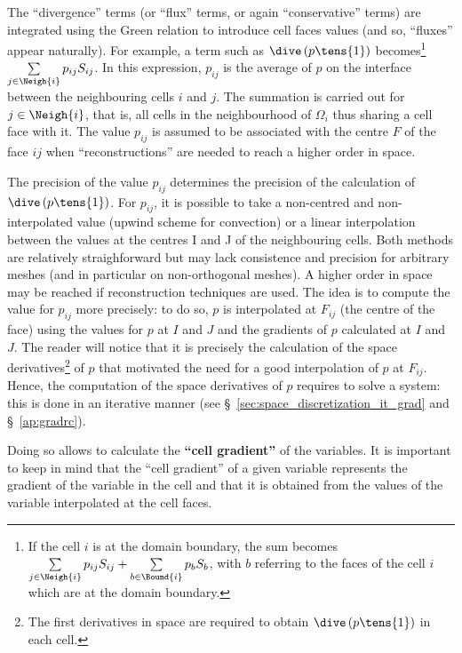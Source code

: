The ``divergence'' terms (or ``flux'' terms, or again ``conservative''
terms) are integrated using the Green relation to introduce cell faces
values (and so, ``fluxes'' appear naturally). For example, a term such as 
$\dive \left(p \tens{1}\right)$ becomes\footnote{%
If the cell $i$ is at the domain boundary, the sum becomes 
$\sum\limits_{j\in \Neigh{i}}p_{ij}S_{ij}+\sum\limits_{b \in \Bound{i}
}p_{b}S_{b}$, 
with $b$ referring to the faces
of the cell $i$ which are at the domain boundary.} 
$\sum\limits_{j \in \Neigh{i}} p_{ij}S_{ij}$.
In this expression, $p_{ij}$
is the average of $p$ on the interface between the neighbouring cells $i$
and $j$. The summation is carried out for $j\in \Neigh{i}$, that is, all
cells in the neighbourhood of $\Omega_{i}$ thus sharing a cell face with
it. The value $p_{ij}$ is
assumed to be associated with the centre $F$
 of the face $ij$ when
``reconstructions'' are needed to reach a higher order in space.

The precision of the value $p_{ij}$ determines the precision of the
calculation of $\dive \left(p \tens{1}\right)$. For $p_{ij}$, it is possible to take a non-centred
and non-interpolated value (upwind scheme for convection) or a linear
interpolation between the values at the centres I and J of the neighbouring
cells. Both methods are relatively straighforward but may lack consistence
and precision for arbitrary meshes (and in particular on non-orthogonal
meshes). A higher order in space may be reached if reconstruction techniques
are used. The idea is to compute the value for $p_{ij}$ more precisely: to
do so, $p$ is interpolated at $F_{ij}$ (the centre of the face) using the
values for $p$ at $I$ and $J$ and the gradients of $p$ calculated at $I$ and $J$.
The reader will notice that it is precisely the calculation of the space
derivatives\footnote{%
The first derivatives in space are required to obtain $\dive \left(p \tens{1}\right)$ in each cell.}
of $p$ that motivated the need for a good interpolation of $p$ at $F_{ij}$.
Hence, the computation of the space derivatives of $p$ requires to solve a
system: this is done in an iterative manner (see \S~\ref{sec:space_discretization_it_grad} and \S~\ref{ap:gradrc}).

Doing so allows to calculate the \textbf{``cell gradient''} of the variables.
It is important to keep in mind that the ``cell gradient'' of a given variable
represents the gradient of the variable in the cell and that it is obtained
from the values of the variable interpolated at the cell faces.

